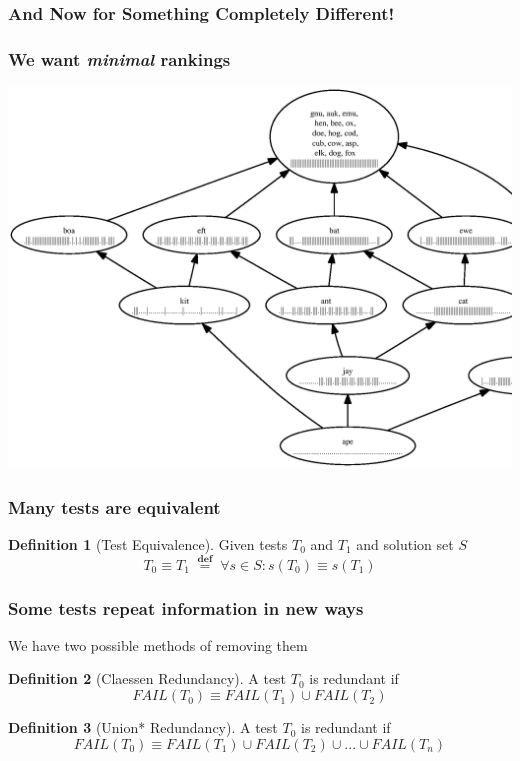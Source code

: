 \documentclass[svgnames]{beamer}
\newcommand\fail{\mathit{FAIL}}
\newcommand\defined{\mathrel{\;\stackrel{\scriptscriptstyle\mathbf{def}}{=}\;}}
\theoremstyle{definition}
\newtheorem{defn}{Definition}
\begin{document}
\begin{frame}
\frametitle{And Now for Something Completely Different!}
\end{frame}

\begin{frame}
\frametitle{We want \emph{minimal} rankings}
\centerline{\includegraphics[height=0.9\textheight]{fail.ps}}
\end{frame}

\begin{frame}
\frametitle{Many tests are equivalent}
\begin{defn}[Test Equivalence]
Given tests $T_0$ and $T_1$ and solution set $S$
$$ T_0 \equiv T_1 \defined \forall s \in S : s(T_0) \equiv s(T_1) $$
\end{defn}
\end{frame}

\begin{frame}
\frametitle{Some tests repeat information in new ways}
We have two possible methods of removing them
\begin{defn}[Claessen Redundancy]
A test $T_0$ is redundant if
$$\fail (T_0) \equiv \fail(T_1) \cup \fail(T_2)$$
\end{defn}
\begin{defn}[Union* Redundancy]
A test $T_0$ is redundant if
$$\fail (T_0) \equiv \fail(T_1) \cup \fail(T_2) \cup ... \cup \fail(T_n) $$
\end{defn}
\end{frame}
\end{document}
